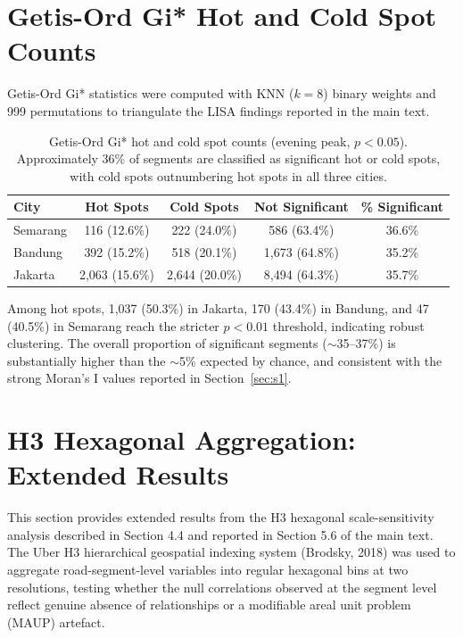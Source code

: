 \documentclass[preprint,12pt]{elsarticle}
\begin{document}
\section{Getis-Ord Gi* Hot and Cold Spot Counts}
\label{sec:s3}

Getis-Ord Gi* statistics were computed with KNN ($k{=}8$) binary weights and 999 permutations to triangulate the LISA findings reported in the main text.

\begin{table}[!htbp]
\centering
\caption{Getis-Ord Gi* hot and cold spot counts (evening peak, $p < 0.05$). Approximately 36\% of segments are classified as significant hot or cold spots, with cold spots outnumbering hot spots in all three cities.}
\label{tab:s3}
\begin{tabular}{lcccc}
\toprule
City & Hot Spots & Cold Spots & Not Significant & \% Significant \\
\midrule
Semarang & 116 (12.6\%) & 222 (24.0\%) & 586 (63.4\%)   & 36.6\% \\
Bandung  & 392 (15.2\%) & 518 (20.1\%) & 1,673 (64.8\%) & 35.2\% \\
Jakarta  & 2,063 (15.6\%) & 2,644 (20.0\%) & 8,494 (64.3\%) & 35.7\% \\
\bottomrule
\end{tabular}
\end{table}

Among hot spots, 1,037 (50.3\%) in Jakarta, 170 (43.4\%) in Bandung, and 47 (40.5\%) in Semarang reach the stricter $p < 0.01$ threshold, indicating robust clustering. The overall proportion of significant segments ($\sim$35--37\%) is substantially higher than the $\sim$5\% expected by chance, and consistent with the strong Moran's I values reported in Section~\ref{sec:s1}.

\section{H3 Hexagonal Aggregation: Extended Results}
\label{sec:s4}

This section provides extended results from the H3 hexagonal scale-sensitivity analysis described in Section 4.4 and reported in Section 5.6 of the main text. The Uber H3 hierarchical geospatial indexing system (Brodsky, 2018) was used to aggregate road-segment-level variables into regular hexagonal bins at two resolutions, testing whether the null correlations observed at the segment level reflect genuine absence of relationships or a modifiable areal unit problem (MAUP) artefact.
\end{document}
